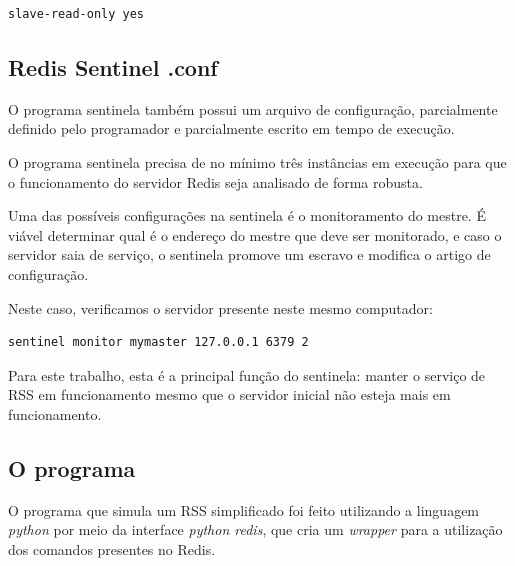 \documentclass[10pt]{IEEEtran}
\begin{document}
\begin{lstlisting}[caption=Diretiva de leitura]
slave-read-only yes
\end{lstlisting}

\subsection{Redis Sentinel .conf}

O programa sentinela também possui um arquivo de configuração, parcialmente definido pelo programador e parcialmente escrito em tempo de execução.

O programa sentinela precisa de no mínimo três instâncias em execução para que o funcionamento do servidor Redis seja analisado de forma robusta.

Uma das possíveis configurações na sentinela é o monitoramento do mestre. É viável determinar qual é o endereço do mestre que deve ser monitorado, e caso o servidor saia de serviço, o sentinela promove um escravo e modifica o artigo de configuração.

Neste caso, verificamos o servidor presente neste mesmo computador:
\begin{lstlisting}
sentinel monitor mymaster 127.0.0.1 6379 2
\end{lstlisting}

Para este trabalho, esta é a principal função do sentinela: manter o serviço de RSS em funcionamento mesmo que o servidor inicial não esteja mais em funcionamento.


\subsection{O programa}

O programa que simula um RSS simplificado foi feito utilizando a linguagem \textit{python} por meio da interface \textit{python redis}, que cria um \textit{wrapper} para a utilização dos comandos presentes no Redis.
\end{document}
